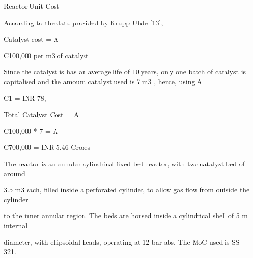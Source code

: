 \documentclass[a4paper,portrait,12pt]{article}
\begin{document}
\begin{flushleft}
Reactor Unit Cost
\end{flushleft}





\begin{flushleft}
According to the data provided by Krupp Uhde [13],
\end{flushleft}


\begin{flushleft}
Catalyst cost = A
\end{flushleft}


\begin{flushleft}
C100,000 per m3 of catalyst
\end{flushleft}


\begin{flushleft}
Since the catalyst is has an average life of 10 years, only one batch of catalyst is capitalised and the amount catalyst used is 7 m3 , hence, using A
\end{flushleft}


\begin{flushleft}
C1 = INR 78,
\end{flushleft}


\begin{flushleft}
Total Catalyst Cost = A
\end{flushleft}


\begin{flushleft}
C100,000 * 7 = A
\end{flushleft}


\begin{flushleft}
C700,000 = INR 5.46 Crores
\end{flushleft}


\begin{flushleft}
The reactor is an annular cylindrical fixed bed reactor, with two catalyst bed of around
\end{flushleft}


\begin{flushleft}
3.5 m3 each, filled inside a perforated cylinder, to allow gas flow from outside the cylinder
\end{flushleft}


\begin{flushleft}
to the inner annular region. The beds are housed inside a cylindrical shell of 5 m internal
\end{flushleft}


\begin{flushleft}
diameter, with ellipsoidal heads, operating at 12 bar abs. The MoC used is SS 321.
\end{flushleft}
\end{document}
